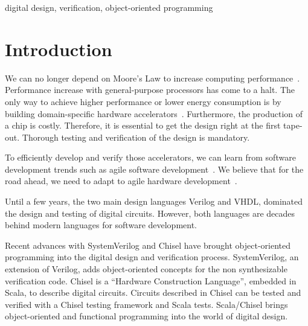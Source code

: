 \documentclass[conference]{IEEEtran}
\newcommand{\martin}[1]{{\color{blue} Martin: #1}}
\newcommand{\ducky}[1]{{\color{orange} Richard: #1}}
\newcommand{\kasper}[1]{{\color{purple} Kasper: #1}}
\renewcommand{\martin}[1]{}
\renewcommand{\kasper}[1]{}
\renewcommand{\ducky}[1]{}
\begin{document}
\begin{IEEEkeywords}
digital design, verification, object-oriented programming
\end{IEEEkeywords}

\martin{We aim for \url{https://woset2020.hotcrp.com/}}

\section{Introduction}
\label{sec:intro}


We can no longer depend on Moore's Law to increase computing performance~\cite{dark-silicon:2011}.
Performance increase with general-purpose processors has come to a halt.
The only way to achieve higher performance or lower energy consumption
is by building domain-specific hardware accelerators~\cite{domain-hw-acc:2020}.
Furthermore, the production of a chip is costly. Therefore, it is essential to get the design right at the first tape-out. Thorough testing and verification of the design is mandatory.

To efficiently develop and verify those accelerators, we can learn from software development trends such as agile software development~\cite{agile:manifesto}.
We believe that for the road ahead, we need to adapt to agile hardware development~\cite{henn-patt:turing:2019}.

Until a few years, the two main design languages Verilog and VHDL, dominated the
design and testing of digital circuits. However, both languages are decades behind
modern languages for software development.

\ducky{Why? What is great (and what do we want to bring over) from SW dev? Remember that SW is cheap and easy to change (so it's worth it to have bugs but ship faster), so it's not necessarily an apples-to-apples comparison.}

Recent advances with SystemVerilog and Chisel \cite{chisel:dac2012, chisel:book} have brought object-oriented programming
into the digital design and verification process. SystemVerilog, an extension of Verilog, adds object-oriented concepts for the non synthesizable verification code.
Chisel is a ``Hardware Construction Language'', embedded in Scala, to describe digital circuits.
Circuits described in Chisel can be tested and verified with a Chisel testing framework and Scala tests.
Scala/Chisel brings object-oriented and functional programming into the world of
digital design.

\ducky{What about OOP is great? How specifically does it benefit HW dev? Note, in SW dev, OOP can be done wrong / badly / verbosely (eg, Java), while (one of) the ASPIRE / ADEPT arguments for Chisel is generators + re-use.}
\martin{Feel free to add those arguments.}
\kasper{I tried to add a little bit below}
\end{document}
